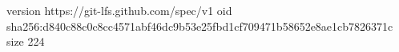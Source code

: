 version https://git-lfs.github.com/spec/v1
oid sha256:d840c88c0c8cc4571abf46dc9b53e25fbd1cf709471b58652e8ae1cb7826371c
size 224
